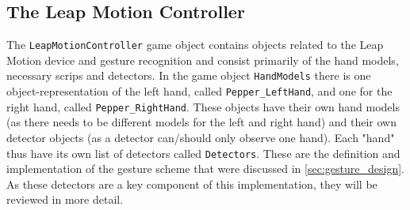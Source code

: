 \subsection{The Leap Motion Controller}
The \texttt{LeapMotionController} game object contains objects related to the Leap Motion device and gesture recognition and consist primarily of the hand models, necessary 
scrips and detectors. In the game object \texttt{HandModels} there is one object-representation of the left hand, called \texttt{Pepper\_LeftHand}, and one for the 
right hand, called \texttt{Pepper\_RightHand}. These objects have their own hand models (as there needs to be different models for the left and right hand) and their 
own detector objects (as a detector can/should only observe one hand). Each "hand" thus have its own list of detectors called \texttt{Detectors}. 
These are the definition and implementation of the gesture scheme that were discussed in \ref{sec:gesture_design}. As these detectors are a key component of 
this implementation, they will be reviewed in more detail.   
 







